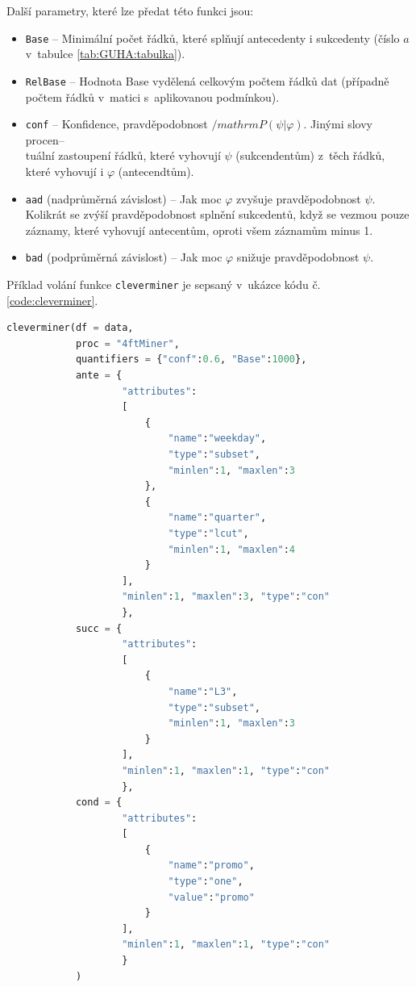 Další parametry, které lze předat této funkci jsou:
\begin{itemize}
    \itemsep0em
    \item \texttt{Base} -- Minimální počet řádků, které splňují antecedenty i sukcedenty (číslo $a$ v~tabulce \ref*{tab:GUHA:tabulka}).
    \item \texttt{RelBase} -- Hodnota Base vydělená celkovým počtem řádků dat (případně počtem řádků v~matici s~aplikovanou podmínkou).
    \item \texttt{conf} -- Konfidence, pravděpodobnost $/mathrm{P}(\psi|\varphi)$. Jinými slovy procen--\\tuální zastoupení řádků, které vyhovují $\psi$ (sukcendentům) z~těch řádků, které vyhovují i $\varphi$ (antecendtům).
    \item \texttt{aad} (nadprůměrná závislost) -- Jak moc $\varphi$ zvyšuje  pravděpodobnost $\psi$. Kolikrát se zvýší pravděpodobnost splnění sukcedentů, když se vezmou pouze záznamy, které vyhovují antecentům, oproti všem záznamům minus 1.
    \item \texttt{bad} (podprůměrná závislost) -- Jak moc $\varphi$ snižuje  pravděpodobnost $\psi$.
\end{itemize}

Příklad volání funkce \texttt{cleverminer} je sepsaný v~ukázce kódu č. \ref*{code:cleverminer}.
\begin{lstlisting}[language=Python, style=mystyle, label={code:cleverminer}, caption={Příklad volání funkce \texttt{cleverminer}.}]
cleverminer(df = data,
            proc = "4ftMiner", 
            quantifiers = {"conf":0.6, "Base":1000},
            ante = {
                    "attributes":
                    [
                        {
                            "name":"weekday", 
                            "type":"subset", 
                            "minlen":1, "maxlen":3
                        },
                        {
                            "name":"quarter", 
                            "type":"lcut", 
                            "minlen":1, "maxlen":4
                        }
                    ], 
                    "minlen":1, "maxlen":3, "type":"con"
                    },
            succ = {
                    "attributes":
                    [
                        {
                            "name":"L3", 
                            "type":"subset", 
                            "minlen":1, "maxlen":3
                        }
                    ], 
                    "minlen":1, "maxlen":1, "type":"con"
                    },
            cond = {
                    "attributes":
                    [
                        {
                            "name":"promo", 
                            "type":"one", 
                            "value":"promo"
                        }
                    ],
                    "minlen":1, "maxlen":1, "type":"con"
                    }
            )
\end{lstlisting}

